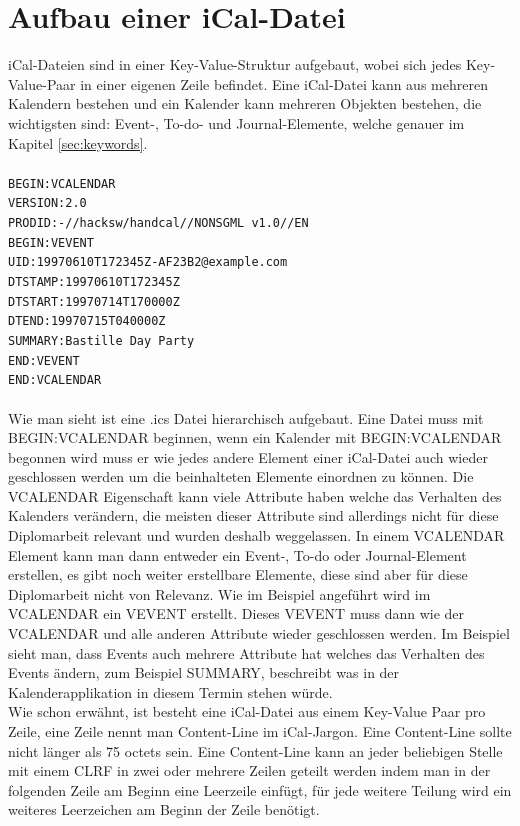 \section{Aufbau einer iCal-Datei}
\label{sec:aufbauEineriCalDatei}
iCal-Dateien sind in einer Key-Value-Struktur aufgebaut, wobei sich jedes Key-Value-Paar in einer eigenen Zeile befindet. Eine iCal-Datei kann aus mehreren Kalendern bestehen und ein Kalender kann mehreren Objekten bestehen, die wichtigsten sind: Event-, To-do- und Journal-Elemente, welche genauer im Kapitel \ref{sec:keywords}.\\\\
\texttt{BEGIN:VCALENDAR\\
 VERSION:2.0\\
 PRODID:-//hacksw/handcal//NONSGML v1.0//EN\\
 BEGIN:VEVENT\\
 UID:19970610T172345Z-AF23B2@example.com\\
 DTSTAMP:19970610T172345Z\\
 DTSTART:19970714T170000Z\\
 DTEND:19970715T040000Z\\
 SUMMARY:Bastille Day Party\\
 END:VEVENT\\
 END:VCALENDAR}\\\\
Wie man sieht ist eine .ics Datei hierarchisch aufgebaut. Eine Datei muss mit BEGIN:VCALENDAR beginnen, wenn ein Kalender mit BEGIN:VCALENDAR begonnen wird muss er wie jedes andere Element einer iCal-Datei auch wieder geschlossen werden um die beinhalteten Elemente einordnen zu können. Die VCALENDAR Eigenschaft kann viele Attribute haben welche das Verhalten des Kalenders verändern, die meisten dieser Attribute sind allerdings nicht für diese Diplomarbeit relevant und wurden deshalb weggelassen. In einem VCALENDAR Element kann man dann entweder ein Event-, To-do oder Journal-Element erstellen, es gibt noch weiter erstellbare Elemente, diese sind aber für diese Diplomarbeit nicht von Relevanz. Wie im Beispiel angeführt wird im VCALENDAR ein VEVENT erstellt. Dieses VEVENT muss dann wie der VCALENDAR und alle anderen Attribute wieder geschlossen werden. Im Beispiel sieht man, dass Events auch mehrere Attribute hat welches das Verhalten des Events ändern, zum Beispiel SUMMARY, beschreibt was in der Kalenderapplikation in diesem Termin stehen würde.\\
Wie schon erwähnt, ist besteht eine iCal-Datei aus einem Key-Value Paar pro Zeile, eine Zeile nennt man Content-Line im iCal-Jargon. Eine Content-Line sollte nicht länger als 75 octets sein. Eine Content-Line kann an jeder beliebigen Stelle mit einem CLRF in zwei oder mehrere Zeilen geteilt werden indem man in der folgenden Zeile am Beginn eine Leerzeile einfügt, für jede weitere Teilung wird ein weiteres Leerzeichen am Beginn der Zeile benötigt. \\\\

